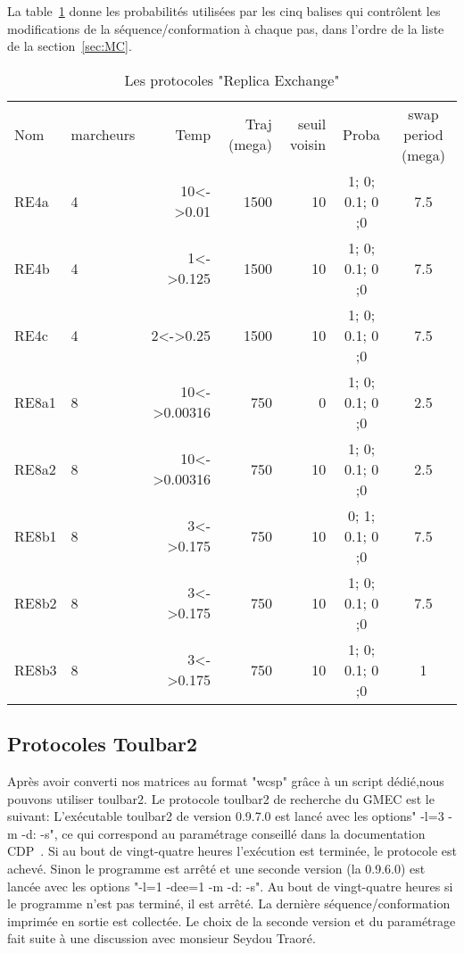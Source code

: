 La table~\ref{tab:protoRE} donne les probabilités utilisées par les cinq balises qui contrôlent les modifications de la séquence/conformation à chaque pas, dans l'ordre de la liste de la section~\ref{sec:MC}. 
    
    \begin{table}[!htbp]
      \centering

      \begin{tabular}{llrrrcc}

        \toprule
        Nom & marcheurs &Temp & Traj (mega)& seuil voisin  & Proba & swap period (mega)\\
        \cmidrule{1-7}
        RE4a   & 4 & 10<->0.01    &  1500 & 10 & 1; 0; 0.1; 0 ;0 &  7.5\\  
        RE4b   & 4 & 1<->0.125    &  1500 & 10 & 1; 0; 0.1; 0 ;0 &  7.5\\  
        RE4c   & 4 & 2<->0.25     &  1500 & 10 & 1; 0; 0.1; 0 ;0 &  7.5\\  
        RE8a1  & 8 & 10<->0.00316 &  750  & 0  & 1; 0; 0.1; 0 ;0 &  2.5\\  
        RE8a2  & 8 & 10<->0.00316 &  750  & 10 & 1; 0; 0.1; 0 ;0 &  2.5\\  
        RE8b1  & 8 & 3<->0.175    &  750  & 10 & 0; 1; 0.1; 0 ;0 &  7.5\\
        RE8b2  & 8 & 3<->0.175    &  750  & 10 & 1; 0; 0.1; 0 ;0 &  7.5\\
        RE8b3  & 8 & 3<->0.175    &  750  & 10 & 1; 0; 0.1; 0 ;0 &  1\\
        \bottomrule

      \end{tabular}      
      \caption{Les protocoles "Replica Exchange"}
\label{tab:protoRE}      
    \end{table}

   \subsection{Protocoles Toulbar2} 
\label{proto_toulbar2}

Après avoir converti nos matrices au format "wcsp" grâce à un script dédié,nous pouvons utiliser toulbar2.
Le protocole toulbar2 de recherche du GMEC est le suivant:
L'exécutable toulbar2 de version 0.9.7.0 est lancé avec les options" -l=3 -m -d: -s", ce qui correspond au paramétrage conseillé dans la documentation CDP~\citep{reftoulbar1,reftoulbar2}. Si au bout de vingt-quatre heures l'exécution est terminée, le protocole est achevé. Sinon le programme est arrêté et une seconde version (la 0.9.6.0) est lancée avec les options "-l=1 -dee=1 -m -d: -s". Au bout de vingt-quatre heures si le programme n'est pas terminé, il est arrêté. La dernière séquence/conformation imprimée en sortie est collectée. Le choix de la seconde version et du paramétrage fait suite à une discussion avec monsieur Seydou Traoré.  

